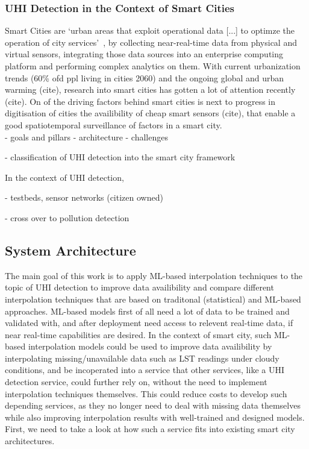 \subsubsection{UHI Detection in the Context of Smart Cities}

Smart Cities are `urban areas that exploit operational data [...] to optimze the operation of city services'~\cite{harrison2010foundations}, by collecting near-real-time data from physical and virtual sensors, integrating those data sources into an enterprise computing platform and performing complex analytics on them. With current urbanization trends (60\% ofd ppl living in cities 2060) and the ongoing global and urban warming (cite), research into smart cities has gotten a lot of attention recently (cite). On of the driving factors behind smart cities is next to progress in digitisation of cities the availibility of cheap smart sensors (cite), that enable a good spatiotemporal surveillance of factors in a smart city.\\
- goals and pillars
- architecture
- challenges

- classification of UHI detection into the smart city framework

In the context of UHI detection,

- testbeds, sensor networks (citizen owned)

- cross over to pollution detection

\subsection{System Architecture}
\label{chap:System Architecture}


The main goal of this work is to apply ML-based interpolation techniques to the topic of UHI detection to improve data availibility and compare different interpolation techniques that are based on traditonal (statistical) and ML-based approaches. ML-based models first of all need a lot of data to be trained and validated with, and after deployment need access to relevent real-time data, if near real-time capabilities are desired. In the context of smart city, such ML-based interpolation models could be used to improve data availibility by interpolating missing/unavailable data such as LST readings under cloudy conditions, and be incoperated into a service that other services, like a UHI detection service, could further rely on, without the need to implement interpolation techniques themselves. This could reduce costs to develop such depending services, as they no longer need to deal with missing data themselves while also improving interpolation results with well-trained and designed models. First, we need to take a look at how such a service fits into existing smart city architectures.

